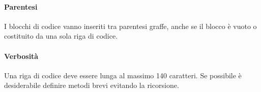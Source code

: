 \paragraph*{Parentesi}
I blocchi di codice vanno inseriti tra parentesi graffe, anche se il blocco è vuoto o costituito da una sola riga di codice.
\paragraph*{Verbosità}
Una riga di codice deve essere lunga al massimo 140 caratteri.
Se possibile è desiderabile definire metodi brevi evitando la ricorsione.


